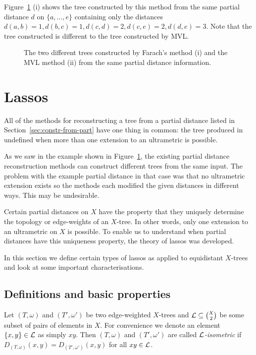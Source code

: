 Figure~\ref{fig:farach-mvl-ex} (i) shows the tree constructed by this method
from the same partial distance $d$ on $\{a,\dotsc,e\}$ containing only the
distances $d(a,b)=1, d(b,c)=1, d(c,d)=2, d(c,e)=2, d(d,e)=3$.  Note that the
tree constructed is different to the tree constructed by MVL.

\begin{figure}
  \centering
  
  \caption{The two different trees constructed by Farach's method (i) and the
    MVL method (ii) from the same partial distance information.}
  \label{fig:farach-mvl-ex}
\end{figure}

\section{Lassos}
\label{sec:lassoing-corralling}

All of the methods for reconstructing a tree from a partial distance
listed in Section~\ref{sec:constr-from-part} have one thing in common: the
tree produced in undefined when more than one extension to an ultrametric is
possible.

As we saw in the example shown in Figure~\ref{fig:farach-mvl-ex}, the existing
partial distance reconstruction methods can construct different trees from the
same input.  The problem with the example partial distance in that case was
that no ultrametric extension exists so the methods each modified the given
distances in different ways.  This may be undesirable.

Certain partial distances on $X$ have the property that they uniquely
determine the topology or edge-weights of an $X$-tree.  In other words, only
one extension to an ultrametric on $X$ is possible.  To enable us to
understand when partial distances have this uniqueness property, the theory of
lassos was developed.

In this section we define certain types of lassos as applied to equidistant
$X$-trees and look at some important characterisations.

\subsection{Definitions and basic properties}
\label{sec:defin-basic-prop}

Let $(T,\omega)$ and $(T',\omega')$ be two edge-weighted $X$-trees and ${\mathcal L}
\subseteq {X \choose 2}$ be some subset of pairs of elements in $X$.  For
convenience we denote an element $\{x,y\} \in {\mathcal L}$ as simply $xy$.  Then
$(T,\omega)$ and $(T',\omega')$ are called \textit{${\mathcal L}$-isometric} if
$D_{(T,\omega)}(x,y) = D_{(T',\omega')}(x,y)$ for all $xy \in {\mathcal L}$.

